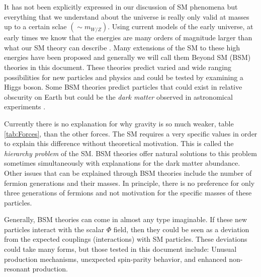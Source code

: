 It has not been explicitly expressed in our discussion of SM phenomena but everything that we understand about the universe is really only valid at masses up to a certain sclae $\left(\sim m_{W/Z}\right)$. Using current models of the early universe, at early times we know that the energies are many orders of magnitude larger than what our SM theory can describe \cite{Weinberg:1977ji}. Many extensions of the SM to these high energies have been proposed and generally we will call them Beyond SM (BSM) theories in this document. These theories predict varied and wide ranging possibilities for new particles and physics and could be tested by examining a Higgs boson. Some BSM theories predict particles that could exist in relative obscurity on Earth but could be the \textit{dark matter} observed in astronomical experiments \cite{Trimble:1987ee}. 

Currently there is no explanation for why gravity is so much weaker, table \ref{tab:Forces}, than the other forces. The SM requires a very specific values in order to explain this difference without theoretical motivation. This is called the \textit{hierarchy problem} of the SM.  BSM theories offer natural solutions to this problem sometimes simultaneously with explanations for the dark matter abundance. Other issues that can be explained through BSM theories include the number of fermion generations and their masses. In principle, there is no preference for only three generations of fermions and not motivation for the specific masses of these particles. 

Generally, BSM theories can come in almost any type imaginable. If these new particles interact with the scalar $\Phi$ field, then they could be seen as a deviation from the expected couplings (interactions) with SM particles. These deviations could take many forms, but those tested in this document include: Unusual production mechanisms, unexpected spin-parity behavior, and enhanced non-resonant production.
